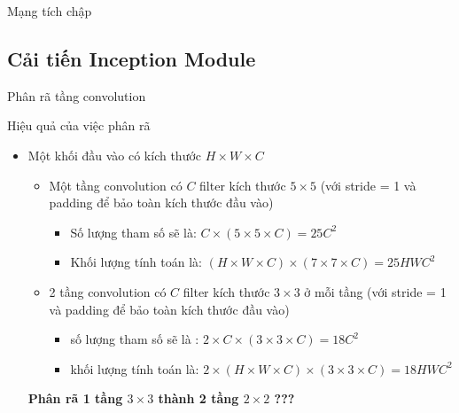 \documentclass[compress]{beamer}
\begin{document}
\begin{frame}{Mạng tích chập}
\subsection{Cải tiến Inception Module}
\begin{frame}{Phân rã tầng convolution}
\begin{itemize}
\end{itemize}
\end{frame}

\begin{frame}{Hiệu quả của việc phân rã}
\begin{itemize}
\item Một khối đầu vào có kích thước $H \times W \times C$ 
\begin{itemize}
\item Một tầng convolution có $C$ filter kích thước $5 \times 5$ (với stride = 1 và padding để bảo toàn kích thước đầu vào) 
\begin{itemize}
\item Số lượng tham số sẽ là: $C \times (5 \times 5 \times C) = 25C^2$ 
\item Khối lượng tính toán là: $(H \times W \times C) \times (7 \times 7 \times C) = 25HWC^2$ 
\end{itemize}
\item 2 tầng convolution có $C$ filter kích thước $3 \times 3$ ở mỗi tầng (với stride = 1 và padding để bảo toàn kích thước đầu vào) 
\begin{itemize}
\item số lượng tham số sẽ là : $2 \times C \times (3 \times 3 \times C) = 18C^2$
\item khối lượng tính toán là: $2 \times (H \times W \times C) \times (3 \times 3 \times C) = 18HWC^2$
\end{itemize}
\end{itemize}
 \textbf{Phân rã 1 tầng $3\times 3$ thành 2 tầng $2 \times 2$ ???}
\end{itemize}
\end{frame}


\end{frame}
\end{document}
